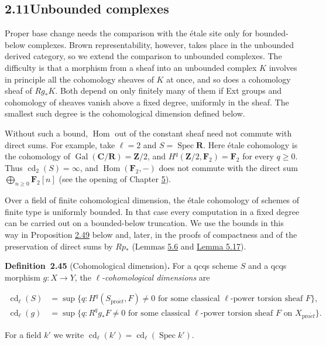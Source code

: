 \documentclass[11pt]{article}
\newenvironment{bpstatement}[2]{\par\addvspace{0.6\baselineskip}\noindent\textbf{#1}#2\textbf{.}\enspace\ignorespaces}
  {\par\addvspace{0.4\baselineskip}}
\providecommand{\Hom}{}\renewcommand{\Hom}{\operatorname{Hom}}
\begin{document}
\subsection*{\texorpdfstring{2.11\quad Unbounded complexes}{2.11 Unbounded complexes}}
\label{bp135}%
\label{bp136}%
Proper base change needs the comparison with the étale site only for bounded-below complexes. Brown representability, however, takes place in the unbounded derived category, so we extend the comparison to unbounded complexes. The difficulty is that a morphism from a sheaf into an unbounded complex \(K\) involves in principle all the cohomology sheaves of \(K\) at once, and so does a cohomology sheaf of \(Rg_*K\). Both depend on only finitely many of them if Ext groups and cohomology of sheaves vanish above a fixed degree, uniformly in the sheaf. The smallest such degree is the cohomological dimension defined below.

Without such a bound, \(\Hom\) out of the constant sheaf need not commute with direct sums. For example, take \(\ell=2\) and \(S=\operatorname{Spec}\mathbf R\). Here étale cohomology is the cohomology of \(\operatorname{Gal}(\mathbf C/\mathbf R)=\mathbf Z/2\), and \(H^q(\mathbf Z/2,\mathbf F_2)=\mathbf F_2\) for every \(q\geq0\). Thus \(\operatorname{cd}_2(S)=\infty\), and \(\Hom(\mathbf F_2,-)\) does not commute with the direct sum \(\bigoplus_{n\geq0}\mathbf F_2[n]\) (see the opening of Chapter \hyperref[bp407]{5}).

Over a field of finite cohomological dimension, the étale cohomology of schemes of finite type is uniformly bounded. In that case every computation in a fixed degree can be carried out on a bounded-below truncation. We use the bounds in this way in Proposition \hyperref[bp146]{2.49} below and, later, in the proofs of compactness and of the preservation of direct sums by \(Rp_*\) (Lemmas \hyperref[bp426]{5.6} and \hyperref[bp463]{Lemma 5.17}).

\label{bp137}%
\begin{bpstatement}{Definition~2.45}{ (Cohomological dimension)}
For a qcqs scheme \(S\) and a qcqs morphism \(g:X\to Y\), the \emph{\(\ell\)-cohomological dimensions} are

\[
\begin{aligned}
\operatorname{cd}_\ell(S)&=\sup\{q: H^q(S_{\mathrm{pro}\acute{e}t},F)\neq0
\text{ for some classical $\ell$-power torsion sheaf $F$}\},\\
\operatorname{cd}_\ell(g)&=\sup\{q: R^qg_*F\neq0
\text{ for some classical $\ell$-power torsion sheaf $F$ on }X_{\mathrm{pro}\acute{e}t}\}.
\end{aligned}
\]

For a field \(k'\) we write \(\operatorname{cd}_\ell(k')=\operatorname{cd}_\ell(\operatorname{Spec}k')\).
\end{bpstatement}
\end{document}
